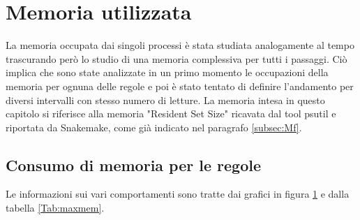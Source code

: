 \section{Memoria utilizzata}
La memoria occupata dai singoli processi è stata studiata analogamente al tempo trascurando però lo studio di una memoria complessiva per tutti i passaggi. 
Ciò implica che sono state analizzate in un primo momento le occupazioni della memoria per ognuna delle regole e poi è stato tentato di definire l'andamento per diversi intervalli con stesso numero di letture.
La memoria intesa in questo capitolo si riferisce alla memoria "Resident Set Size" ricavata dal tool psutil e riportata da Snakemake, come già indicato nel paragrafo \ref{subsec:Mf}. 

\subsection{Consumo di memoria per le regole}
Le informazioni sui vari comportamenti sono tratte dai grafici in figura \ref{fig:RSSr} e dalla tabella \ref{Tab:maxmem}.
\begin{figure}[H]
\centering
{} \quad
{} \\
\end{figure}
\begin{figure}[H]
\ContinuedFloat
\centering
{} \quad
{} \\
\end{figure}
\begin{figure}[H]
\ContinuedFloat
\centering
{} 
\caption{}
\label{fig:RSSr}
\end{figure}

